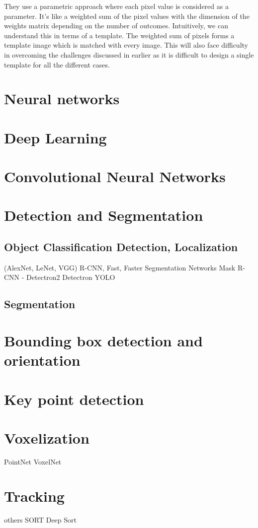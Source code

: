 They use a parametric approach where each pixel value is considered as a
parameter. It’s like a weighted sum of the pixel values with the dimension of
the weights matrix depending on the number of outcomes. Intuitively, we can
understand this in terms of a template. The weighted sum of pixels forms a
template image which is matched with every image. This will also face difficulty
in overcoming the challenges discussed in earlier as it is difficult to design a
single template for all the different cases.

\section{Neural networks}



\section{Deep Learning}
\section{Convolutional Neural Networks}
\section{Detection and Segmentation}
\subsection{Object Classification Detection, Localization }
    (AlexNet, LeNet, VGG)
    R-CNN, Fast, Faster
    Segmentation Networks
    Mask R-CNN - Detectron2
    Detectron
    YOLO
\subsection{Segmentation}
\section{Bounding box detection and orientation}
\section{Key point detection}
\section{Voxelization }
PointNet
VoxelNet
\section{Tracking}
others
SORT
Deep Sort

